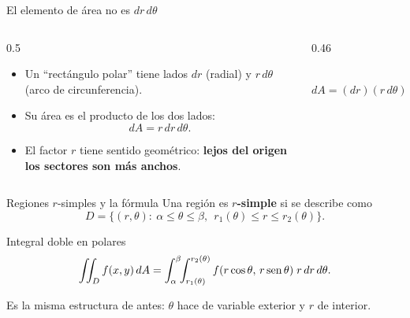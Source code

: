 \documentclass[11pt,aspectratio=169]{beamer}
\begin{document}
\begin{frame}{El elemento de área no es $dr\,d\theta$}
  \begin{columns}
    \begin{column}{0.5\textwidth}
      \begin{itemize}
        \item Un ``rectángulo polar'' tiene lados $dr$ (radial) y $r\,d\theta$ (arco de circunferencia).
        \pause
        \item Su área es el producto de los dos lados:
        \[
          dA = r\,dr\,d\theta.
        \]
        \pause
        \item El factor $r$ tiene sentido geométrico: \textbf{lejos del origen los sectores son más anchos}.
      \end{itemize}
    \end{column}
    \begin{column}{0.46\textwidth}
      \centering
      \\[2pt]
      {\footnotesize\color{gray60} $dA = (dr)(r\,d\theta) = r\,dr\,d\theta$}
    \end{column}
  \end{columns}
  \vspace{2pt}
\end{frame}

\begin{frame}{Regiones $r$-simples y la fórmula}
  Una región es \textbf{$r$-simple} si se describe como
  \[
    D=\{(r,\theta):\ \alpha\le\theta\le\beta,\ \ r_1(\theta)\le r\le r_2(\theta)\}.
  \]
  \pause
  \begin{block}{Integral doble en polares}
    \[
      \iint_D f(x,y)\,dA
      = \int_\alpha^\beta\!\!\int_{r_1(\theta)}^{r_2(\theta)}
        f(r\cos\theta,\,r\operatorname{sen}\theta)\;r\,dr\,d\theta.
    \]
  \end{block}
  \pause
  \begin{center}\small\color{gray60}
  Es la misma estructura de antes: $\theta$ hace de variable exterior y $r$ de interior.
  \end{center}
\end{frame}
\end{document}
